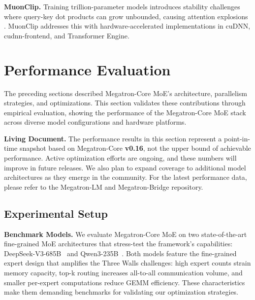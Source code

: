 \textbf{MuonClip.}
Training trillion-parameter models introduces stability challenges where query-key dot products can grow unbounded, causing attention explosions \cite{kimik2}. MuonClip addresses this with hardware-accelerated implementations in cuDNN, cudnn-frontend, and Transformer Engine.

\section{Performance Evaluation}\label{performance-evaluations}
The preceding sections described Megatron-Core MoE's architecture, parallelism strategies, and optimizations. This section validates these contributions through empirical evaluation, showing the performance of the Megatron-Core MoE stack across diverse model configurations and hardware platforms.

\begin{notebox}
\textbf{Living Document.} The performance results in this section represent a point-in-time snapshot based on Megatron-Core \textbf{v0.16}, not the upper bound of achievable performance. Active optimization efforts are ongoing, and these numbers will improve in future releases. We also plan to expand coverage to additional model architectures as they emerge in the community. For the latest performance data, please refer to the Megatron-LM and Megatron-Bridge repository.
\end{notebox}

\subsection{Experimental Setup}

\textbf{Benchmark Models.}
We evaluate Megatron-Core MoE on two state-of-the-art fine-grained MoE architectures that stress-test the framework's capabilities: DeepSeek-V3-685B~\cite{deepseekai2025deepseekv3technicalreport} and Qwen3-235B~\cite{qwen2025qwen25technicalreport,yang2025qwen3technicalreport}. Both models feature the fine-grained expert design that amplifies the Three Walls challenges: high expert counts strain memory capacity, top-k routing increases all-to-all communication volume, and smaller per-expert computations reduce GEMM efficiency. These characteristics make them demanding benchmarks for validating our optimization strategies.

